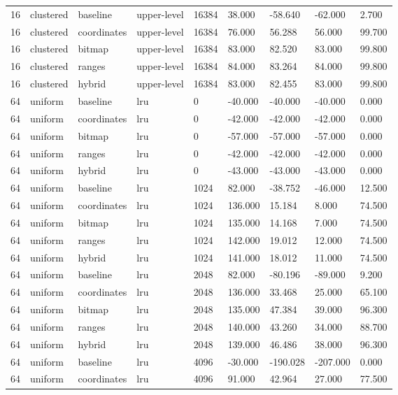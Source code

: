 \begin{tabular}{lllllllll}
16 & clustered & baseline & upper-level & 16384 & 38.000 & -58.640 & -62.000 & 2.700 \\
16 & clustered & coordinates & upper-level & 16384 & 76.000 & 56.288 & 56.000 & 99.700 \\
16 & clustered & bitmap & upper-level & 16384 & 83.000 & 82.520 & 83.000 & 99.800 \\
16 & clustered & ranges & upper-level & 16384 & 84.000 & 83.264 & 84.000 & 99.800 \\
16 & clustered & hybrid & upper-level & 16384 & 83.000 & 82.455 & 83.000 & 99.800 \\
64 & uniform & baseline & lru & 0 & -40.000 & -40.000 & -40.000 & 0.000 \\
64 & uniform & coordinates & lru & 0 & -42.000 & -42.000 & -42.000 & 0.000 \\
64 & uniform & bitmap & lru & 0 & -57.000 & -57.000 & -57.000 & 0.000 \\
64 & uniform & ranges & lru & 0 & -42.000 & -42.000 & -42.000 & 0.000 \\
64 & uniform & hybrid & lru & 0 & -43.000 & -43.000 & -43.000 & 0.000 \\
64 & uniform & baseline & lru & 1024 & 82.000 & -38.752 & -46.000 & 12.500 \\
64 & uniform & coordinates & lru & 1024 & 136.000 & 15.184 & 8.000 & 74.500 \\
64 & uniform & bitmap & lru & 1024 & 135.000 & 14.168 & 7.000 & 74.500 \\
64 & uniform & ranges & lru & 1024 & 142.000 & 19.012 & 12.000 & 74.500 \\
64 & uniform & hybrid & lru & 1024 & 141.000 & 18.012 & 11.000 & 74.500 \\
64 & uniform & baseline & lru & 2048 & 82.000 & -80.196 & -89.000 & 9.200 \\
64 & uniform & coordinates & lru & 2048 & 136.000 & 33.468 & 25.000 & 65.100 \\
64 & uniform & bitmap & lru & 2048 & 135.000 & 47.384 & 39.000 & 96.300 \\
64 & uniform & ranges & lru & 2048 & 140.000 & 43.260 & 34.000 & 88.700 \\
64 & uniform & hybrid & lru & 2048 & 139.000 & 46.486 & 38.000 & 96.300 \\
64 & uniform & baseline & lru & 4096 & -30.000 & -190.028 & -207.000 & 0.000 \\
64 & uniform & coordinates & lru & 4096 & 91.000 & 42.964 & 27.000 & 77.500 \\

\end{tabular}
